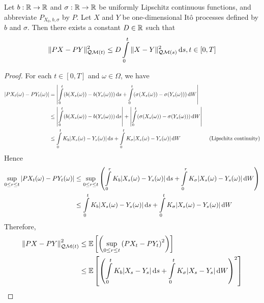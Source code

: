 \begin{lemma}
  \label{lemma:inequality-for-Piscard-operator-and-QM-norm}
  Let $b:\mathbb{R}\to\mathbb{R}$ and $\sigma:\mathbb{R}\to\mathbb{R}$ be uniformly Lipschitz continuous functions, and abbreviate $P_{X_0,b,\sigma}$ by $P$. Let $X$ and $Y$ be one-dimensional Itô processes defined by $b$ and $\sigma$. Then there exists a constant $D\in\mathbb{R}$ such that
  \begin{equation}
    \|PX - PY\|_{\mathcal{Q}\mathcal{M}(t)}^2 \le D\int\limits_0^t\|X-Y\|_{\mathcal{Q}\mathcal{M}(s)}^2\,\mathrm{d} s, t\in[0,T]
  \end{equation}
\end{lemma}

\begin{proof}
  For each $t\in[0,T]$ and $\omega\in\Omega$, we have
  \begin{align*}
    \left|PX_t(\omega)-PY_t(\omega)\right|
     & = \left|\int\limits_0^t (b(X_s(\omega))-b(Y_s(\omega)))\,\mathrm{d} s + \int\limits_0^t (\sigma(X_s(\omega))-\sigma(Y_s(\omega)))\,\mathrm{d} W\right|                                                 \\
     & \le \left|\int\limits_0^t (b(X_s(\omega))-b(Y_s(\omega)))\,\mathrm{d} s\right| + \left|\int\limits_0^t (\sigma(X_s(\omega))-\sigma(Y_s(\omega)))\,\mathrm{d} W\right|                                  \\
     & \le \int\limits_0^t K_b|X_s(\omega)-Y_s(\omega)|\,\mathrm{d} s + \int\limits_0^t K_\sigma|X_s(\omega)-Y_s(\omega)|\,\mathrm{d} W                                      & \text{ (Lipschitz continuity)} \\
  \end{align*}
  Hence
  \begin{align*}
    \sup\limits_{0\le r\le t}\left|PX_t(\omega)-PY_t(\omega)\right|
     & \le \sup\limits_{0\le r\le t}\left(\int\limits_0^r K_b|X_s(\omega)-Y_s(\omega)|\,\mathrm{d} s + \int\limits_0^r K_\sigma|X_s(\omega)-Y_s(\omega)|\,\mathrm{d} W\right) \\
     & \le \int\limits_0^t K_b|X_s(\omega)-Y_s(\omega)|\,\mathrm{d} s + \int\limits_0^t K_\sigma|X_s(\omega)-Y_s(\omega)|\,\mathrm{d} W
  \end{align*}
  Therefore,
  \begin{align*}
    \left\|PX-PY\right\|_{\Q\M(t)}^2
     & \le \EE\left[\left(\sup\limits_{0\le r\le t}\left(PX_t-PY_t\right)^2\right)\right]                                                                           \\
     & \le  \EE\left[\left(\int\limits_0^t K_b|X_s-Y_s|\d s + \int\limits_0^t K_\sigma|X_s-Y_s|\d W\right)^2\right]                                                 \\

\end{align*}
\end{proof}
